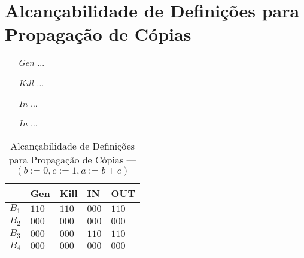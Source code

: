 \section{Alcan\c{c}abilidade de Defini\c{c}\~oes para Propaga\c{c}\~ao de C\'opias}

\begin{itemize}
  \item[$Gen$] ...
  \item[$Kill$] ...
  \item[$In$] ...
  \item[$In$] ...
\end{itemize}

\begin{table}[ht]
\centering
\begin{tabular}{l|l|l|l|l}
	& Gen & Kill & IN & OUT\\
\hline
$B_{1}$ &  $110$ & $110$ & $000$ & $110$\\
$B_{2}$ &  $000$ & $000$ & $000$ & $000$\\
$B_{3}$ &  $000$ & $000$ & $110$ & $110$\\
$B_{4}$ &  $000$ & $000$ & $000$ & $000$\\
\end{tabular}
\caption{Alcan\c{c}abilidade de Defini\c{c}\~oes para Propaga\c{c}\~ao de C\'opias --- $(b:=0, c:=1, a:=b+c)$}
\end{table}

